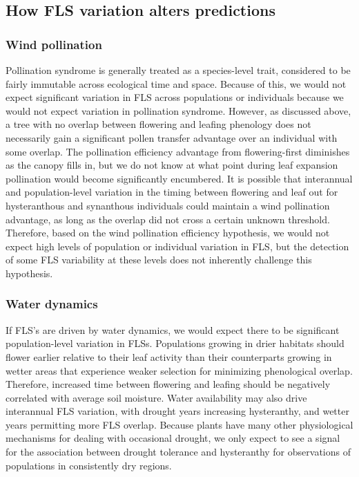 \documentclass[12pt]{article}\usepackage[]{graphicx}\usepackage[]{color}
\begin{document}
\subsection*{How FLS variation alters predictions}
\subsubsection*{Wind pollination} 
\indent\indent  Pollination syndrome is generally treated as a species-level trait, considered to be fairly immutable across ecological time and space. Because of this, we would not expect significant variation in FLS across populations or individuals because we would not expect variation in pollination syndrome. However, as discussed above, a tree with no overlap between flowering and leafing phenology does not necessarily gain a significant pollen transfer advantage over an individual with some overlap. The pollination efficiency advantage from flowering-first diminishes as the canopy fills in, but  we do not know at what point during leaf expansion pollination would become significantly encumbered. It is possible that interannual and population-level variation in the timing between flowering and leaf out for hysteranthous and synanthous individuals could maintain a wind pollination advantage, as long as the overlap did not cross a certain unknown threshold. Therefore, based on the wind pollination efficiency hypothesis, we would not expect high levels of population or individual variation in FLS, but the detection of some FLS variability at these levels does not inherently challenge this hypothesis.
\subsubsection*{Water dynamics} 
\indent\indent If FLS's are driven by water dynamics, we would expect there to be significant population-level variation in FLSs. Populations growing in drier habitats should flower earlier relative to their leaf activity than their counterparts growing in wetter areas that experience weaker selection for minimizing phenological overlap. Therefore, increased time between flowering and leafing should be negatively correlated with average soil moisture. Water availability may also drive interannual FLS variation, with drought years increasing hysteranthy, and wetter years permitting more FLS overlap. Because plants have many other physiological mechanisms for dealing with occasional drought, we only expect to see a signal for the association between drought tolerance and hysteranthy for observations of populations in consistently dry regions. %
\end{document}
